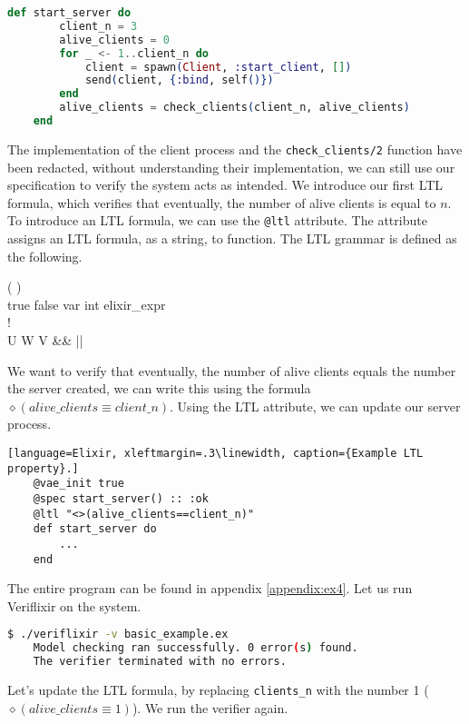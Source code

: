 \begin{lstlisting}[language=Elixir, xleftmargin=.2\linewidth]
    def start_server do
        client_n = 3
        alive_clients = 0
        for _ <- 1..client_n do
            client = spawn(Client, :start_client, [])
            send(client, {:bind, self()})
        end
        alive_clients = check_clients(client_n, alive_clients)
    end
\end{lstlisting}
The implementation of the client process and the \texttt{check\_clients/2} function have been redacted, without understanding their implementation, we can still use our specification to verify the system acts as intended. We introduce our first LTL formula, which verifies that eventually, the number of alive clients is equal to $n$. To introduce an LTL formula, we can use the \texttt{@ltl} attribute. The attribute assigns an LTL formula, as a string, to function. The LTL grammar is defined as the following.
\begin{bnf*}
      { \bnfor (  ) \bnfor {}   \bnfor {} }\\
      {true \bnfor false \bnfor var \bnfor int \bnfor elixir\_expr}\\
      {\square \bnfor \diamond \bnfor !}\\
      {U \bnfor W \bnfor V \bnfor \&\& \bnfor || \bnfor \rightarrow \bnfor \leftrightarrow }\\
\end{bnf*}
We want to verify that eventually, the number of alive clients equals the number the server created, we can write this using the formula $\diamond (alive\_clients \equiv client\_n)$. Using the LTL attribute, we can update our server process.
\begin{lstlisting}[language=Elixir, xleftmargin=.3\linewidth, caption={Example LTL property}.]
    @vae_init true
    @spec start_server() :: :ok
    @ltl "<>(alive_clients==client_n)"
    def start_server do
        ...
    end
\end{lstlisting}
The entire program can be found in appendix \ref{appendix:ex4}. Let us run Veriflixir on the system.
\begin{lstlisting}[language=bash, xleftmargin=.3\linewidth]
    $ ./veriflixir -v basic_example.ex
    Model checking ran successfully. 0 error(s) found.
    The verifier terminated with no errors.
\end{lstlisting}
Let's update the LTL formula, by replacing \texttt{clients\_n} with the number 1 ($\diamond (alive\_clients \equiv 1)$). We run the verifier again.
